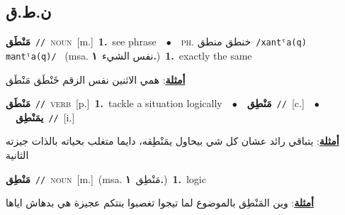 \documentclass[10pt,a4paper,twoside]{article} %
\begin{document}
\begin{multicols}{2}
\vspace{-3mm}
\subsection*{\color{blue}\foreignlanguage{arabic}{ن.ط.ق}\color{blue}{}} 

{\setlength\topsep{0pt}\textbf{\foreignlanguage{arabic}{مَنْطَق}}\ {\color{gray}\texttt{//}\color{black}}\ \textsc{noun}\ [m.]\ \textbf{1.}~see phrase\ \ $\bullet$\ \ \textsc{ph.} \color{gray} \foreignlanguage{arabic}{خنطق منطق}\color{black}\ {\color{gray}\texttt{/{\sffamily xantˤa(q) mantˤa(q)}/}\color{black}}\ \color{gray} (msa. \foreignlanguage{arabic}{نفس الشيء}~\foreignlanguage{arabic}{\textbf{١.}})\color{black}\ \textbf{1.}~exactly the same\  \begin{flushright}\color{gray}\foreignlanguage{arabic}{\textbf{\underline{\foreignlanguage{arabic}{أمثلة}}}: همي الاثنين نفس الزقم خَنْطَق مَنْطَق}\end{flushright}\color{black}} \vspace{2mm}

{\setlength\topsep{0pt}\textbf{\foreignlanguage{arabic}{مَنْطَق}}\ {\color{gray}\texttt{//}\color{black}}\ \textsc{verb}\ [p.]\ \textbf{1.}~tackle a situation logically\ \ $\bullet$\ \ \setlength\topsep{0pt}\textbf{\foreignlanguage{arabic}{مَنْطِق}}\ {\color{gray}\texttt{//}\color{black}}\ [c.]\ \ $\bullet$\ \ \setlength\topsep{0pt}\textbf{\foreignlanguage{arabic}{يمَنْطِق}}\ {\color{gray}\texttt{//}\color{black}}\ [i.]\  \begin{flushright}\color{gray}\foreignlanguage{arabic}{\textbf{\underline{\foreignlanguage{arabic}{أمثلة}}}: يتباقي رائد عشان كل شي بيحاول يمَنْطِقه، دايما متغلب بحياته بالذات جيزته الثانية}\end{flushright}\color{black}} \vspace{2mm}

{\setlength\topsep{0pt}\textbf{\foreignlanguage{arabic}{مَنْطِق}}\ {\color{gray}\texttt{//}\color{black}}\ \textsc{noun}\ [m.]\ \color{gray}(msa. \foreignlanguage{arabic}{مَنْطِق}~\foreignlanguage{arabic}{\textbf{١.}})\color{black}\ \textbf{1.}~logic\  \begin{flushright}\color{gray}\foreignlanguage{arabic}{\textbf{\underline{\foreignlanguage{arabic}{أمثلة}}}: وين المَنْطِق بالموضوع لما تيجوا تغصبوا بنتكم عجيزة هي بدهاش اياها}\end{flushright}\color{black}} \vspace{2mm}


\end{multicols}
\end{document}
